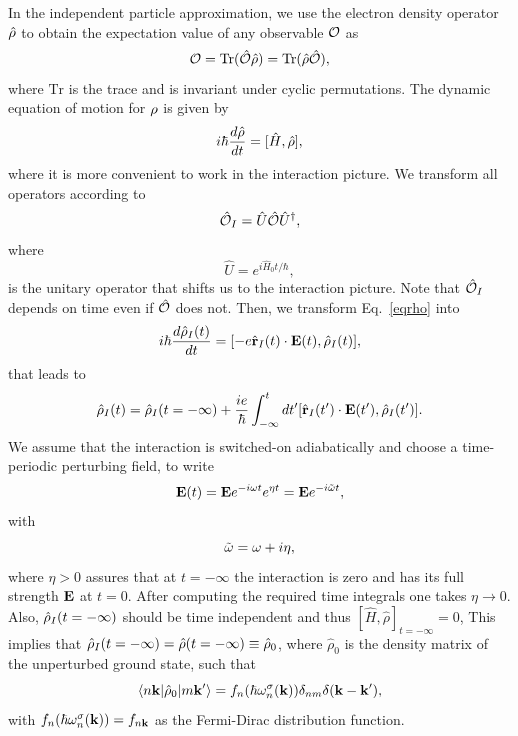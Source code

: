 \documentclass[floatfix,prb,aps,superscriptaddress,11pt,preprint,letterpaper]{revtex4}
\begin{document}
In the independent particle approximation, we use the electron density
operator $\hat{{\rho}}$ to obtain the expectation value of any observable
${\cal O}$ as
\begin{equation}\label{traza}
{\cal O}=\mathrm{Tr}(\hat{{\cal O}}\hat\rho)=\mathrm{Tr}(\hat\rho\hat{{\cal O}}),
\end{equation}
where $\mathrm{Tr}$ is the trace and is invariant under cyclic permutations.
The dynamic equation of motion for ${\rho}$ is given by
\begin{equation}\label{eqrho}
i\hbar \frac{d\hat{{\rho}}}{dt}=[\hat{H},\hat{{\rho}}]
,
\end{equation}
where it is more convenient to work in the interaction picture. We transform 
all operators according to 
\begin{equation}\label{ip}
\hat{{\cal O}}_I=\hat{U}\hat{{\cal O}}\hat{U}^\dagger,
\end{equation}
where
\begin{equation}\label{ou}
\hat{U}=e^{i\hat{H}_0t/\hbar},
\end{equation}
is the unitary operator that shifts us to the interaction picture.
Note that $\hat{{\cal O}}_I$ depends on time even if $\hat{{\cal O}}$ does not.
Then, we transform Eq.~\eqref{eqrho} into
\begin{equation}\label{intrho}
i\hbar\frac{d\hat{{\rho}}_I(t)}{dt}=[-e\hat{\mathbf{r}}_I(t)\cdot\mathbf{E}(t),\hat{{\rho}}_I(t)],
\end{equation}
that leads to
\begin{equation}\label{intrho2}
\hat{{\rho}}_I(t)=\hat{{\rho}}_I(t=-\infty)
+
\frac{ie}{\hbar}\int_{-\infty}^t dt'[\hat{\mathbf{r}}_I(t')\cdot\mathbf{E}(t'),\hat{{\rho}}_I(t')].
\end{equation}
We assume that the interaction is switched-on adiabatically and
choose a time-periodic perturbing field, to write
\begin{equation}\label{efield}
\mathbf{E}(t)=\mathbf{E} e^{-i\omega t}e^{\eta t}=\mathbf{E} e^{-i\tilde\omega t}
,
\end{equation}
with
\begin{equation}\label{got}
\tilde\omega=\omega+i\eta
,
\end{equation} 
where $\eta > 0$ assures
that at $t=-\infty$ the interaction is zero and has its full strength $\mathbf{E}$ 
at $t=0$. After computing the required time integrals one takes
$\eta\to 0$. 
Also, $\hat{{\rho}}_I(t=-\infty)$ should be time independent and thus 
$[\hat{H},\hat\rho]_{t=-\infty}=0$, This implies that 
$\hat{{\rho}}_I(t=-\infty)=\hat\rho(t=-\infty)\equiv\hat\rho_0$,
where $\hat\rho_0$ is
the density matrix of the unperturbed ground state,
such that
\begin{equation}\label{nrhon}
\langle n\mathbf{k} |\hat{{\rho}}_0| m\mathbf{k}' \rangle=f_n(\hbar\omega^\sigma_n(\mathbf{k}))\delta_{nm}\delta(\mathbf{k}-\mathbf{k}')
,
\end{equation}
with $f_n(\hbar\omega^\sigma_n(\mathbf{k}))=f_{n\mathbf{k}}$ as the Fermi-Dirac distribution function.
\end{document}

